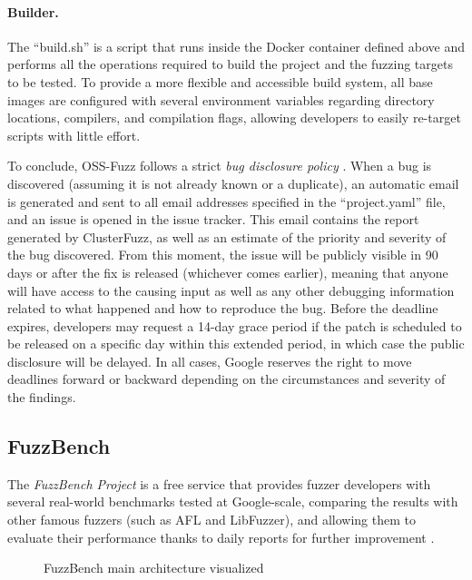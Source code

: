 \paragraph{Builder.} The ``build.sh'' is a script that runs inside the Docker container defined above and performs all the operations required to build the project and the fuzzing targets to be tested. To provide a more flexible and accessible build system, all base images are configured with several environment variables regarding directory locations, compilers, and compilation flags, allowing developers to easily re-target scripts with little effort.


\newpage
To conclude, OSS-Fuzz follows a strict \textit{bug disclosure policy} \cite{bug_disclosure}.
When a bug is discovered (assuming it is not already known or a duplicate), an automatic email is generated and sent to all email addresses specified in the ``project.yaml'' file, and an issue is opened in the issue tracker. This email contains the report generated by ClusterFuzz, as well as an estimate of the priority and severity of the bug discovered. From this moment, the issue will be publicly visible in 90 days or after the fix is released (whichever comes earlier), meaning that anyone will have access to the causing input as well as any other debugging information related to what happened and how to reproduce the bug. Before the deadline expires, developers may request a 14-day grace period if the patch is scheduled to be released on a specific day within this extended period, in which case the public disclosure will be delayed. In all cases, Google reserves the right to move deadlines forward or backward depending on the circumstances and severity of the findings.




\subsection{FuzzBench}
The \textit{FuzzBench Project} \cite{fuzzbench_paper} is a free service that provides fuzzer developers with several real-world benchmarks tested at Google-scale, comparing the results with other famous fuzzers (such as AFL and LibFuzzer), and allowing them to evaluate their performance thanks to daily reports for further improvement \cite{fuzzbench_docs}.

\begin{figure}[h]
\caption{FuzzBench main architecture visualized \cite{fuzzbench_docs}}
\label{fig:fuzzbench_architecture}
\end{figure}

